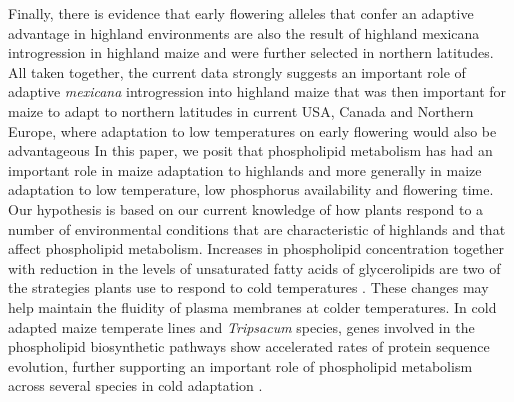\documentclass[9pt,twocolumn,twoside]{BioRxiv}
\begin{document}
Finally, there is evidence that early flowering alleles that confer an adaptive advantage in highland environments are also the result of highland mexicana introgression in highland maize \citep{Guo2018-on} and were further selected in northern latitudes. 
All taken together, the current data strongly suggests an important role of adaptive \textit{mexicana} introgression into highland maize that was then important for maize to adapt to northern latitudes in current USA, Canada and Northern Europe, where adaptation to low temperatures on early flowering would also be advantageous    
In this paper, we posit that phospholipid metabolism has had an important role in maize adaptation to highlands and more generally in maize adaptation to low temperature, low phosphorus availability and flowering time.   
Our hypothesis is based on our current knowledge of how plants respond to a number of environmental conditions that are characteristic of highlands and that affect phospholipid metabolism. 
Increases in phospholipid concentration \citep{Degenkolbe2012-wf} together with reduction in the levels of unsaturated fatty acids of glycerolipids \citep{Welti2002-uk} are two of the strategies plants use to respond to cold temperatures \citep{Lynch1987-ln}. 
These changes may help maintain the fluidity of plasma membranes at colder temperatures.
In cold adapted maize temperate lines and \textit{Tripsacum} species, genes involved in the phospholipid biosynthetic pathways show accelerated rates of protein sequence evolution, further supporting an important role of phospholipid metabolism across several species in cold adaptation \cite{Yan2019-tx}. 
 
\end{document}
